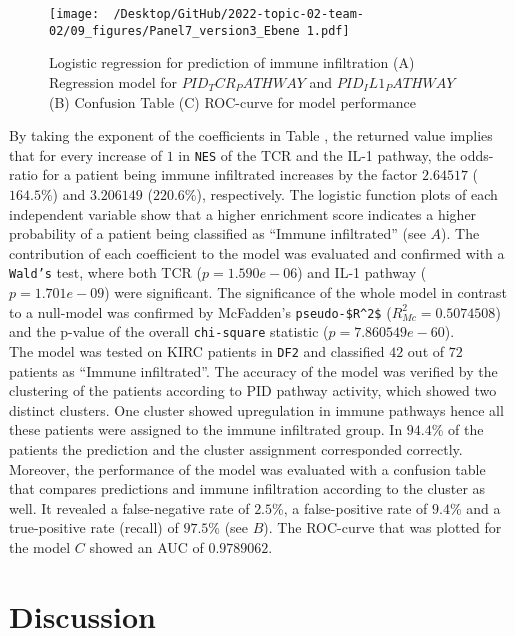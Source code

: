 \documentclass[
  parskip,
  oneside]{scrreprt}
\begin{document}
\begin{figure}[t]
  \texttt{[image: ~/Desktop/GitHub/2022-topic-02-team-02/09\_figures/Panel7\_version3\_Ebene 1.pdf]}
  \caption{Logistic regression for prediction of immune infiltration (A) Regression model for $PID_TCR_PATHWAY$ and $PID_IL1_PATHWAY$ (B) Confusion Table (C) ROC-curve for model performance}
  \label{log}
\end{figure}

By taking the exponent of the coefficients in Table , the
returned value implies that for every increase of \(1\) in \texttt{NES}
of the TCR and the IL-1 pathway, the odds-ratio for a patient being
immune infiltrated increases by the factor \(2.64517\) (\(164.5\%\)) and
\(3.206149\) (\(220.6\%\)), respectively. The logistic function plots of
each independent variable show that a higher enrichment score indicates
a higher probability of a patient being classified as ``Immune
infiltrated'' (see  \(A\)). The contribution of each
coefficient to the model was evaluated and confirmed with a
\texttt{Wald’s} test, where both TCR (\(p= 1.590e-06\)) and IL-1 pathway
(\(p= 1.701e-09\)) were significant. The significance of the whole model
in contrast to a null-model was confirmed by McFadden's
\texttt{pseudo-\$R\^{}2\$} (\(R_{Mc}^2=0.5074508\)) and the p-value of
the overall \texttt{chi-square} statistic (\(p=7.860549e-60\)).\\
The model was tested on KIRC patients in \texttt{DF2} and classified
\(42\) out of \(72\) patients as ``Immune infiltrated''. The accuracy of
the model was verified by the clustering of the patients according to
PID pathway activity, which showed two distinct clusters. One cluster
showed upregulation in immune pathways hence all these patients were
assigned to the immune infiltrated group. In \(94.4\)\% of the patients
the prediction and the cluster assignment corresponded correctly.
Moreover, the performance of the model was evaluated with a confusion
table that compares predictions and immune infiltration according to the
cluster as well. It revealed a false-negative rate of \(2.5\)\%, a
false-positive rate of \(9.4\)\% and a true-positive rate (recall) of
\(97.5\)\% (see  \(B\)). The ROC-curve that was plotted for
the model \(C\) showed an AUC of \(0.9789062\).

\hypertarget{discussion}{%
\chapter{Discussion}\label{discussion}}
\end{document}
